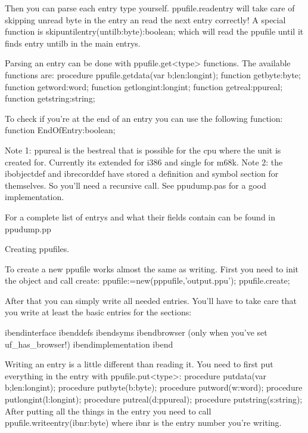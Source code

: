 \documentclass{report}
\begin{document}
{Then you can parse each entry type yourself. ppufile.readentry will take
care of skipping unread byte in the entry an read the next entry
correctly! A special function is skipuntilentry(untilb:byte):boolean;
which will read the ppufile until it finds entry untilb in the main
entrys.

Parsing an entry can be done with ppufile.get<type> functions. The
available functions are:
    procedure ppufile.getdata(var b;len:longint);
    function  getbyte:byte;                                                     
    function  getword:word;                                                     
    function  getlongint:longint;                                               
    function  getreal:ppureal;                                                  
    function  getstring:string;      

To check if you're at the end of an entry you can use the following
function:
    function  EndOfEntry:boolean;                                               

Note 1: ppureal is the bestreal that is possible for the cpu where the
unit is created for. Currently its extended for i386 and single for m68k.
Note 2: the ibobjectdef and ibrecorddef have stored a definition and
symbol section for themselves. So you'll need a recursive call. See
ppudump.pas for a good implementation.

For a complete list of entrys and what their fields contain can be found
in ppudump.pp



Creating ppufiles.

To create a new ppufile works almost the same as writing. First you need
to init the object and call create:
  ppufile:=new(pppufile,'output.ppu');
  ppufile.create;

After that you can simply write all needed entries. You'll have to take
care that you write at least the basic entries for the sections:

  ibendinterface
  ibenddefs
  ibendsyms
  ibendbrowser (only when you've set uf_has_browser!)
  ibendimplementation
  ibend

Writing an entry is a little different than reading it. You need to first
put everything in the entry with ppufile.put<type>:
    procedure putdata(var b;len:longint);                                       
    procedure putbyte(b:byte);                                                  
    procedure putword(w:word);                                                  
    procedure putlongint(l:longint);                                            
    procedure putreal(d:ppureal);                                               
    procedure putstring(s:string);      
After putting all the things in the entry you need to call
ppufile.writeentry(ibnr:byte) where ibnr is the entry number you're 
writing.

}
\end{document}
